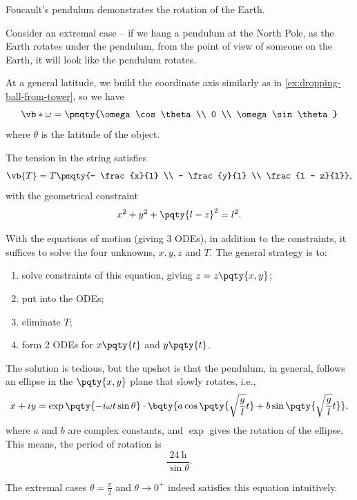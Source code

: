 \begin{example}
    \label{ex:foucault}%
    Foucault's pendulum demonstrates the rotation of the Earth.

    Consider an extremal case -- if we hang a pendulum at the North Pole, as the Earth rotates under the pendulum, from the point of view of someone on the Earth, it will look like the pendulum rotates.

    At a general latitude, we build the coordinate axis similarly as in \autoref{ex:dropping-ball-from-tower}, so we have
    \begin{equation}
        \vb*{\omega} = \pmqty{\omega \cos \theta \\ 0 \\ \omega \sin \theta}
    \end{equation}
    where \(\theta\) is the latitude of the object.

    The tension in the string satisfies
    \begin{equation}
        \vb{T} = T \pmqty{- \frac{x}{l} \\ - \frac{y}{l} \\ \frac{l - z}{l}},
    \end{equation}
    with the geometrical constraint
    \begin{equation}
        x^2 + y^2 + \pqty{l - z}^2 = l^2.
    \end{equation}

    With the equations of motion (giving 3 ODEs), in addition to the constraints, it suffices to solve the four unknowns, \(x, y, z\) and \(T\). The general strategy is to:
    \begin{enumerate}
        \item solve constraints of this equation, giving \(z = z \pqty{x, y}\);
        \item put into the ODEs;
        \item eliminate \(T\);
        \item form 2 ODEs for \(x\pqty{t}\) and \(y\pqty{t}\).
    \end{enumerate}

    The solution is tedious, but the upshot is that the pendulum, in general, follows an ellipse in the \(\pqty{x, y}\) plane that slowly rotates, i.e.,
    \begin{equation}
        x + iy = \exp \pqty{- i \omega t \sin \theta} \cdot \bqty{a \cos \pqty{\sqrt{\frac{g}{l}} t} + b \sin \pqty{\sqrt{\frac{g}{l}} t}},
    \end{equation}
    where \(a\) and \(b\) are complex constants, and \(\exp\) gives the rotation of the ellipse. This means, the period of rotation is
    \begin{equation}
        \frac{\SI{24}{\hour}}{\sin \theta}.
    \end{equation}

    The extremal cases \(\theta = \frac{\pi}{2}\) and \(\theta \to 0^+\) indeed satisfies this equation intuitively.
\end{example}